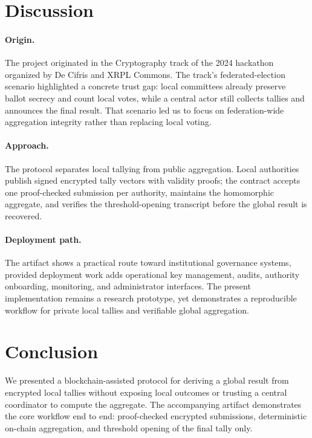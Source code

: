 
\section{Discussion}

\paragraph{Origin.}
The project originated in the Cryptography track of the 2024 hackathon
organized by De Cifris and XRPL Commons. The track's federated-election
scenario highlighted a concrete trust gap: local committees already preserve
ballot secrecy and count local votes, while a central actor still collects
tallies and announces the final result. That scenario led us to focus on
federation-wide aggregation integrity rather than replacing local voting.

\paragraph{Approach.}
The protocol separates local tallying from public aggregation. Local
authorities publish signed encrypted tally vectors with validity proofs; the
contract accepts one proof-checked submission per authority, maintains the
homomorphic aggregate, and verifies the threshold-opening transcript before
the global result is recovered.

\paragraph{Deployment path.}
The artifact shows a practical route toward institutional governance systems,
provided deployment work adds operational key management, audits, authority
onboarding, monitoring, and administrator interfaces. The present
implementation remains a research prototype, yet demonstrates a reproducible
workflow for private local tallies and verifiable global aggregation.

\section{Conclusion}

We presented a blockchain-assisted protocol for deriving a global result from
encrypted local tallies without exposing local outcomes or trusting a central
coordinator to compute the aggregate. The accompanying artifact demonstrates the
core workflow end to end: proof-checked encrypted submissions, deterministic
on-chain aggregation, and threshold opening of the final tally only.
